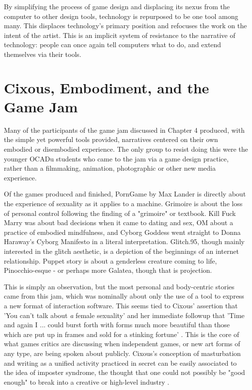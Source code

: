 By simplifying the process of game design and displacing its nexus from the computer to other design tools, technology is repurposed to be one tool among many. This displaces technology's primary position and refocuses the work on the intent of the artist. This is an implicit system of resistance to the narrative of technology: people can once again tell computers what to do, and extend themselves via their tools.

\section{Cixous, Embodiment, and the Game Jam}

Many of the participants of the game jam discussed in Chapter 4 produced, with the simple yet powerful tools provided, narratives centered on their own embodied or disembodied experience. The only group to resist doing this were the younger OCADu students who came to the jam via a game design practice, rather than a filmmaking, animation, photographic or other new media experience.

Of the games produced and finished, PornGame by Max Lander is directly about the experience of sexuality as it applies to a machine. Grimoire is about the loss of personal control following the finding of a "grimoire" or textbook. Kill Fuck Marry was about bad decisions when it came to dating and sex, OM about a practice of embodied mindfulness, and Cyborg Goddess went straight to Donna Haraway's Cyborg Manifesto in a literal interpretation. Glitch.95, though mainly interested in the glitch aesthetic, is a depiction of the beginnings of an internet relationship. Puppet story is about a genderless creature coming to life, Pinocchio-esque - or perhaps more Galatea, though that is projection.

This is simply an observation, but the most personal and body-centric stories came from this jam, which was nominally about only the use of a tool to express a new format of interaction software. This seems tied to Cixous' assertion that 'You can't talk about \textit{a} female sexuality' and her immediate followup that 'Time and again I ... could burst forth with forms much more beautiful than those which are put up in frames and sold for a stinking fortune' \parencite{cixous}. This is the core of what games critics are discussing when independent games, or new art forms of any type, are being spoken about publicly. Cixous's conception of masturbation and writing as a unified activity practiced in secret can be easily associated to the idea of imposter syndrome, the thought that one could not possibly be "good enough" to break into a creative or high-level industry \cite{imposter}. 

